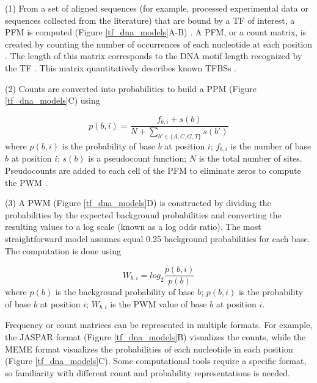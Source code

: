     (1) From a set of aligned sequences (for example, processed experimental data or sequences collected from the literature) that are bound by a TF of interest, a \ac{PFM} is computed ({Figure \ref{tf_dna_models}}A-B) \cite{ambrosini2018pwmscan}. A PFM, or a count matrix, is created by counting the number of occurrences of each nucleotide at each position \cite{stormo2013modeling,wasserman2004applied,weirauch2013evaluation}. The length of this matrix corresponds to the DNA motif length recognized by the TF \cite{ambrosini2020insights}. This matrix quantitatively describes known \ac{TFBSs} \cite{wasserman2004applied}.

    (2) Counts are converted into probabilities to build a \ac{PPM} ({Figure \ref{tf_dna_models}}C) using

    \begin{equation}
      p(b,i)=\frac{f_{b,i}+s(b)}{N+\sum\limits_{b'\in\{A,C,G,T\}}s(b')}
      \label{ppm}
    \end{equation}
    where $ p(b,i) $ is the probability of base $ b $ at position $ i $; $ f_{b,i} $ is the number of base $ b $ at position $ i $; $ s(b) $ is a pseudocount function; $ N $ is the total number of sites. Pseudocounts are added to each cell of the PFM to eliminate zeros to compute the PWM \cite{wasserman2004applied}.

    (3) A PWM ({Figure \ref{tf_dna_models}}D) is constructed by dividing the probabilities by the expected background probabilities and converting the resulting values to a log scale (known as a log odds ratio). The most straightforward model assumes equal 0.25 background probabilities for each base. The computation is done using

    \begin{equation}
      W_{b,i}=log_{2}\frac{p(b,i)}{p(b)}
      \label{pwm}
    \end{equation}
    where $ p(b) $ is the background probability of base $ b $; $ p(b,i) $ is the probability of base $ b $ at position $ i $; $ W_{b,i} $ is the PWM value of base $ b $ at position $ i $.

    Frequency or count matrices can be represented in multiple formats. For example, the JASPAR format ({Figure \ref{tf_dna_models}}B) visualizes the counts, while the MEME format visualizes the probabilities of each nucleotide in each position ({Figure \ref{tf_dna_models}}C). Some computational tools require a specific format, so familiarity with different count and probability representations is needed.

